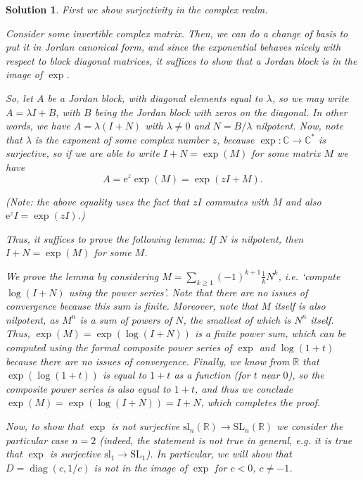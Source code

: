 \documentclass{article}
\theoremstyle{nonumberplain}
\newtheorem{sol}{Solution}
\newcommand{\R}{\mathbb{R}}
\newcommand{\C}{\mathbb{C}}
\newcommand{\e}{\mathrm{e}}
\DeclareMathOperator{\diag}{diag}
\renewcommand{\lg}[1]{\mathrm{#1}}
\newcommand{\la}[1]{\mathrm{#1}}
\begin{document}
\begin{sol}
First we show surjectivity in the complex realm.

Consider some invertible complex matrix. Then, we can do a change of basis to put it in Jordan canonical form, and since the exponential behaves nicely with respect to block diagonal matrices, it suffices to show that a Jordan block is in the image of $\exp$.

So, let $A$ be a Jordan block, with diagonal elements equal to $\lambda$, so we may write $A = \lambda I + B$, with $B$ being the Jordan block with zeros on the diagonal. In other words, we have $A = \lambda (I + N)$ with $\lambda \neq 0$ and $N = B / \lambda$ nilpotent. Now, note that $\lambda$ is the exponent of some complex number $z$, because $\exp \colon \C \to \C^*$ is surjective, so if we are able to write $I + N = \exp(M)$ for some matrix $M$ we have
\begin{equation}
A = \e^z \exp(M) = \exp(z I + M).
\end{equation}

(Note: the above equality uses the fact that $z I$ commutes with $M$ and also $\e^z I = \exp(z I)$.)

Thus, it suffices to prove the following lemma: If $N$ is nilpotent, then $I+N = \exp(M)$ for some $M$.

We prove the lemma by considering $M = \sum_{k \geq 1} (-1)^{k+1} \frac1k N^k$, i.e. `compute $\log(I + N)$ using the power series'. Note that there are no issues of convergence because this sum is finite. Moreover, note that $M$ itself is also nilpotent, as $M^n$ is a sum of powers of $N$, the smallest of which is $N^n$ itself. Thus, $\exp(M) = \exp(\log(I+N))$ is a finite power sum, which can be computed using the formal composite power series of $\exp$ and $\log(1+t)$ because there are no issues of convergence. Finally, we know from $\R$ that $\exp(\log(1+t))$ is equal to $1+t$ as a function (for $t$ near $0$), so the composite power series is also equal to $1+t$, and thus we conclude $\exp(M) = \exp(\log(I+N)) = I+N$, which completes the proof.

\medskip

Now, to show that $\exp$ is not surjective $\la{sl}_n(\R) \to \lg{SL}_n(\R)$ we consider the particular case $n = 2$ (indeed, the statement is not true in general, e.g. it is true that $\exp$ is surjective $\la{sl}_1 \to \lg{SL}_1$). In particular, we will show that $D = \diag(c,1/c)$ is not in the image of $\exp$ for $c < 0$, $c \neq -1$.


\end{sol}
\end{document}
